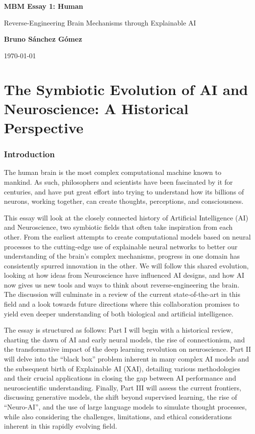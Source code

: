 \documentclass[11pt,a4paper]{article}
\author{Bruno Sánchez Gómez}
\date{\today}
\begin{document}
\begin{titlepage}
    \centering
    \vspace*{2cm}
    {\Huge \bfseries MBM Essay 1: Human \par}
    \vspace{2cm}
    {\Large {\Huge Reverse-Engineering Brain Mechanisms through Explainable AI} \par}
    \vspace{8cm}
    {\large \textbf{Bruno Sánchez Gómez} \par}
    \vfill
    {\large \today \par}
\end{titlepage}


\part{The Symbiotic Evolution of AI and Neuroscience: A Historical Perspective}

\section{Introduction}

The human brain is the most complex computational machine known to mankind. As such, philosophers and scientists have been fascinated by it for centuries, and have put great effort into trying to understand how its billions of neurons, working together, can create thoughts, perceptions, and consciousness.

This essay will look at the closely connected history of Artificial Intelligence (AI) and Neuroscience, two symbiotic fields that often take inspiration from each other. From the earliest attempts to create computational models based on neural processes to the cutting-edge use of explainable neural networks to better our understanding of the brain's complex mechanisms, progress in one domain has consistently spurred innovation in the other. We will follow this shared evolution, looking at how ideas from Neuroscience have influenced AI designs, and how AI now gives us new tools and ways to think about reverse-engineering the brain. The discussion will culminate in a review of the current state-of-the-art in this field and a look towards future directions where this collaboration promises to yield even deeper understanding of both biological and artificial intelligence.

The essay is structured as follows: Part I will begin with a historical review, charting the dawn of AI and early neural models, the rise of connectionism, and the transformative impact of the deep learning revolution on neuroscience. Part II will delve into the ``black box'' problem inherent in many complex AI models and the subsequent birth of Explainable AI (XAI), detailing various methodologies and their crucial applications in closing the gap between AI performance and neuroscientific understanding. Finally, Part III will assess the current frontiers, discussing generative models, the shift beyond supervised learning, the rise of ``Neuro-AI'', and the use of large language models to simulate thought processes, while also considering the challenges, limitations, and ethical considerations inherent in this rapidly evolving field.
\end{document}
